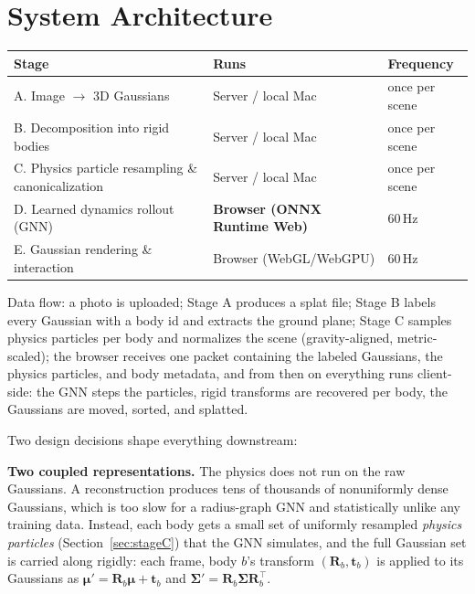 \documentclass[11pt]{article}
\newcommand{\R}{\mathbf{R}}
\newcommand{\tr}{\mathbf{t}}
\begin{document}
\section{System Architecture}
\label{sec:architecture}

\begin{center}
\begin{tabular}{@{}lll@{}}
\toprule
\textbf{Stage} & \textbf{Runs} & \textbf{Frequency} \\
\midrule
A. Image $\rightarrow$ 3D Gaussians & Server / local Mac & once per scene \\
B. Decomposition into rigid bodies & Server / local Mac & once per scene \\
C. Physics particle resampling \& canonicalization & Server / local Mac & once per scene \\
D. Learned dynamics rollout (GNN) & \textbf{Browser (ONNX Runtime Web)} & 60\,Hz \\
E. Gaussian rendering \& interaction & Browser (WebGL/WebGPU) & 60\,Hz \\
\bottomrule
\end{tabular}
\end{center}

Data flow: a photo is uploaded; Stage A produces a splat file; Stage B labels every Gaussian with a body id and extracts the ground plane; Stage C samples physics particles per body and normalizes the scene (gravity-aligned, metric-scaled); the browser receives one packet containing the labeled Gaussians, the physics particles, and body metadata, and from then on everything runs client-side: the GNN steps the particles, rigid transforms are recovered per body, the Gaussians are moved, sorted, and splatted.

Two design decisions shape everything downstream:

\textbf{Two coupled representations.} The physics does not run on the raw Gaussians. A reconstruction produces tens of thousands of nonuniformly dense Gaussians, which is too slow for a radius-graph GNN and statistically unlike any training data. Instead, each body gets a small set of uniformly resampled \emph{physics particles} (Section~\ref{sec:stageC}) that the GNN simulates, and the full Gaussian set is carried along rigidly: each frame, body $b$'s transform $(\R_b, \tr_b)$ is applied to its Gaussians as $\boldsymbol{\mu}' = \R_b \boldsymbol{\mu} + \tr_b$ and $\boldsymbol{\Sigma}' = \R_b \boldsymbol{\Sigma} \R_b^\top$.
\end{document}
